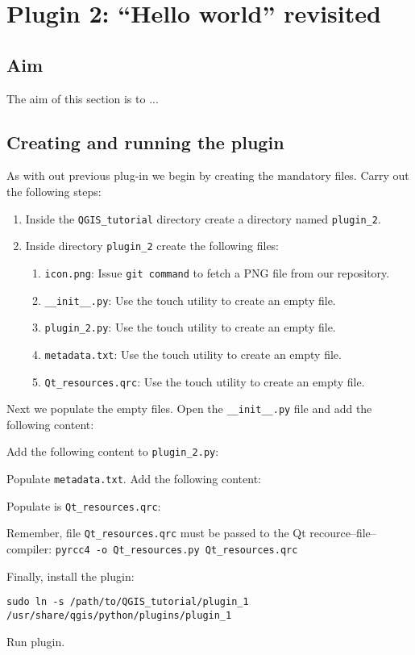 \section{Plugin 2: ``Hello world'' revisited}
\label{sect:plugin_2}
\subsection{Aim}
\label{ssect:plugin_2_aim}
\par %
The aim of this section is to ...
\subsection{Creating and running the plugin}
\label{ssect:creating_plugin_1}
\par %
As with out previous plug-in we begin by creating the mandatory files. Carry out the following steps:
\begin{enumerate}
  \item Inside the \lstinline{QGIS_tutorial} directory create a directory named \lstinline{plugin_2}.
  \item Inside directory \lstinline{plugin_2} create the following files:
  \begin{enumerate}
    \item \lstinline{icon.png}: Issue \lstinline{git command} to fetch a PNG file from our repository.
    \item \lstinline{__init__.py}: Use the touch utility to create an empty file.
    \item \lstinline{plugin_2.py}: Use the touch utility to create an empty file.
    \item \lstinline{metadata.txt}: Use the touch utility to create an empty file.
    \item \lstinline{Qt_resources.qrc}: Use the touch utility to create an empty file.
  \end{enumerate}
\end{enumerate}
Next we populate the empty files. Open the \lstinline{__init__.py} file and add the following content:

\par%
Add the following content to \lstinline{plugin_2.py}:

\par%
Populate \lstinline{metadata.txt}. Add the following content:

\par%
Populate is \lstinline{Qt_resources.qrc}:

Remember, file \lstinline{Qt_resources.qrc} must be passed to the Qt recource--file--compiler:
\lstinline{pyrcc4 -o Qt_resources.py Qt_resources.qrc}
\par%
Finally, install the plugin:
\begin{lstlisting}
sudo ln -s /path/to/QGIS_tutorial/plugin_1 /usr/share/qgis/python/plugins/plugin_1
\end{lstlisting}
\par%
Run plugin.

